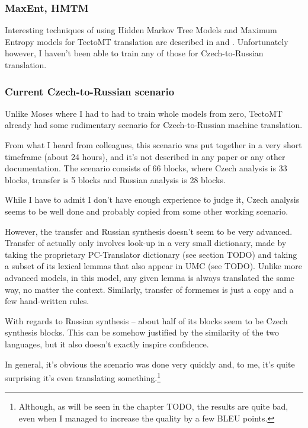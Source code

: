 \subsubsection{MaxEnt, HMTM}
Interesting techniques of using Hidden Markov Tree Models and Maximum Entropy models for TectoMT translation are described in \cite{tecto_hmtm} and \cite{tecto_maxent}. Unfortunately however, I haven't been able to train any of those for Czech-to-Russian translation.

\subsubsection{Current Czech-to-Russian scenario}
Unlike Moses where I had to had to train whole models from zero, TectoMT already had some rudimentary scenario for Czech-to-Russian machine translation.

From what I heard from colleagues, this scenario was put together in a very short timeframe (about 24 hours), and it's not described in any paper or any other documentation. The scenario consists of 66 blocks, where Czech analysis is 33 blocks, transfer is 5 blocks and Russian analysis is 28 blocks. 

While I have to admit I don't have enough experience to judge it, Czech analysis seems to be well done and probably copied from some other working scenario.

However, the transfer and Russian synthesis doesn't seem to be very advanced. Transfer of  actually only involves look-up in a very small dictionary, made by taking the proprietary PC-Translator dictionary (see section TODO) and taking a subset of its lexical lemmas that also appear in UMC (see TODO). Unlike more advanced models, in this model, any given lemma is always translated the same way, no matter the context. Similarly, transfer of formemes is just a copy and a few hand-written rules.

With regards to Russian synthesis -- about half of its blocks seem to be Czech synthesis blocks.
This can be somehow justified by the similarity of the two languages, but it also doesn't exactly inspire confidence.


In general, it's obvious the scenario was done very quickly and, to me, it's quite surprising it's even translating something.\footnote{Although, as will be seen in the chapter TODO, the results are quite bad, even when I managed to increase the quality by a few BLEU points.}
